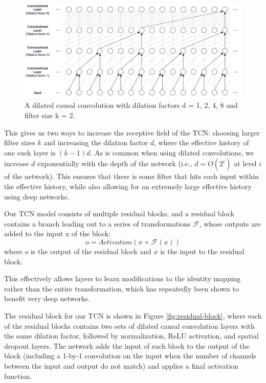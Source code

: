 \documentclass[12pt,a4paper,titlepage,openany]{report}
\begin{document}
\begin{figure}[H]
    \centering
    \includegraphics[width=1\linewidth]{images/Chapter3_Methodology/dilation factor.png}
    \caption{A dilated causal convolution with dilation factors d = 1, 2, 4, 8 and filter size k = 2.\cite{mathworks2024seq2seq}}
    \label{fig:dilation-factor}
\end{figure}

This gives us two ways to increase the receptive field of the TCN: choosing larger filter sizes \(k\) and increasing the dilation factor \(d\), where the effective history of one such layer is \((k - 1)d\). As is common when using dilated convolutions, we increase \(d\) exponentially with the depth of the network (i.e., \(d = O(2^i)\) at level \(i\) of the network). This ensures that there is some filter that hits each input within the effective history, while also allowing for an extremely large effective history using deep networks.

Our TCN model consists of multiple residual blocks, and a residual block contains a branch leading out to a series of transformations \(\mathcal{F}\), whose outputs are added to the input x of the block:
\begin{equation}
    o = Activation(x + \mathcal{F}(x))
    \label{eq:activation}
\end{equation}
where \(o\) is the output of the residual block and \(x\) is the input to the residual block.

This effectively allows layers to learn modifications to the identity mapping rather than the entire transformation, which has repeatedly been shown to benefit very deep networks.

The residual block for our TCN is shown in Figure \ref{fig:residual-block}, where each of the residual blocks contains two sets of dilated causal convolution layers with the same dilation factor, followed by normalization, ReLU activation, and spatial dropout layers. The network adds the input of each block to the output of the block (including a 1-by-1 convolution on the input when the number of channels between the input and output do not match) and applies a final activation function. 
\end{document}
